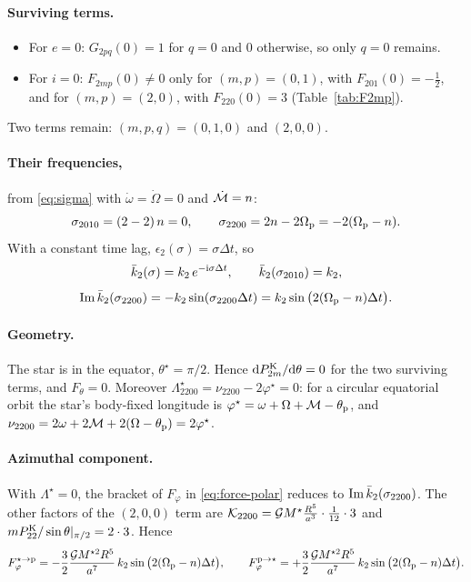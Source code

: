 \paragraph{Surviving terms.}
\begin{itemize}
  \item For $e=0$: $G_{2pq}(0)=1$ for $q=0$ and $0$ otherwise, so only $q=0$ remains.
  \item For $i=0$: $F_{2mp}(0)\neq0$ only for $(m,p)=(0,1)$, with $F_{201}(0)=-\tfrac12$, and for $(m,p)=(2,0)$, with $F_{220}(0)=3$ (Table~\ref{tab:F2mp}).
\end{itemize}
Two terms remain: $(m,p,q)=(0,1,0)$ and $(2,0,0)$.

\paragraph{Their frequencies,} from \eqref{eq:sigma} with $\dot\omega=\dot\Omega=0$ and $\dot{\mathcal{M}}=n$:
\[
  \sigma_{2010}=(2-2)\,n=0,\qquad \sigma_{2200}=2n-2\Omega_{\mathrm p}=-2(\Omega_{\mathrm p}-n).
\]
With a constant time lag, $\epsilon_2(\sigma)=\sigma\Delta t$, so
\[
  \bar k_2(\sigma)=k_2\,e^{-\mathrm{i}\sigma\Delta t},\qquad \bar k_2(\sigma_{2010})=k_2,
\]
\[
  \operatorname{Im}\bar k_2(\sigma_{2200})=-k_2\sin(\sigma_{2200}\Delta t)=k_2\sin\big(2(\Omega_{\mathrm p}-n)\Delta t\big).
\]

\paragraph{Geometry.} The star is in the equator, $\theta^\star=\pi/2$. Hence $\mathrm{d}P^{\mathrm K}_{2m}/\mathrm{d}\theta=0$ for the two surviving terms, and $F_\theta=0$. Moreover $\Lambda^\star_{2200}=\nu_{2200}-2\varphi^\star=0$: for a circular equatorial orbit the star's body-fixed longitude is $\varphi^\star=\omega+\Omega+\mathcal{M}-\theta_{\mathrm p}$, and $\nu_{2200}=2\omega+2\mathcal{M}+2(\Omega-\theta_{\mathrm p})=2\varphi^\star$.

\paragraph{Azimuthal component.} With $\Lambda^\star=0$, the bracket of $F_\varphi$ in \eqref{eq:force-polar} reduces to $\operatorname{Im}\bar k_2(\sigma_{2200})$. The other factors of the $(2,0,0)$ term are $\mathcal K_{2200}=\mathcal{G} M^\star\frac{R^5}{a^3}\cdot\tfrac1{12}\cdot3$ and $mP^{\mathrm K}_{22}/\sin\theta|_{\pi/2}=2\cdot3$. Hence
\[
  F^{\star\to\mathrm p}_\varphi=-\frac{3}{2}\frac{\mathcal{G} M^{\star2}R^5}{a^7}\,k_2\sin\big(2(\Omega_{\mathrm p}-n)\Delta t\big),\qquad
  F^{\mathrm p\to\star}_\varphi=+\frac{3}{2}\frac{\mathcal{G} M^{\star2}R^5}{a^7}\,k_2\sin\big(2(\Omega_{\mathrm p}-n)\Delta t\big).
\]
